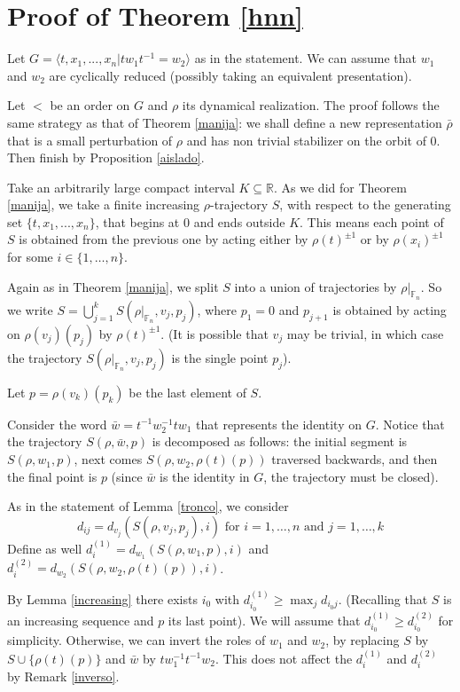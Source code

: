 \documentclass[12pt]{article}
\newcommand{\F}{\mathbb{F}}
\newcommand{\R}{\mathbb{R}}
\theoremstyle{definition}
\begin{document}
\section{Proof of Theorem \ref{hnn}} 

Let $G=\langle t,x_1,...,x_n|tw_1t^{-1}=w_2\rangle$ as in the statement. We can assume that $w_1$ and $w_2$ are cyclically reduced (possibly taking an equivalent presentation). 

Let $<$ be an order on $G$ and $\rho$ its dynamical realization. The proof follows the same strategy as that of Theorem \ref{manija}: we shall define a new representation $\bar\rho$ that is a small perturbation of $\rho$ and has non trivial stabilizer on the orbit of 0. Then finish by Proposition \ref{aislado}.

Take an arbitrarily large compact interval $K\subseteq \R$. As we did for Theorem \ref{manija}, we take a finite increasing $\rho$-trajectory $S$, with respect to the generating set $\{t,x_1,...,x_n\}$, that begins at $0$ and ends outside $K$. This means each point of $S$ is obtained from the previous one by acting either by $\rho(t)^{\pm 1}$ or by $\rho(x_i)^{\pm 1}$ for some $i\in\{1,\ldots,n\}$. 

Again as in Theorem \ref{manija}, we split $S$ into a union of trajectories by $\rho|_{\F_n}$. So we write $S=\bigcup_{j=1}^k S(\rho|_{\F_n},v_j,p_j)$, where $p_1=0$ and $p_{j+1}$ is obtained by acting on $\rho(v_j)(p_j)$ by $\rho(t)^{\pm 1}$. (It is possible that $v_j$ may be trivial, in which case the trajectory $S(\rho|_{\F_n},v_j,p_j)$ is the single point $p_j$). 

Let $p=\rho(v_k)(p_k)$ be the last element of $S$.

Consider the word $\bar w=t^{-1}w_2^{-1}tw_1$ that represents the identity on $G$. Notice that the trajectory $S(\rho,\bar w,p)$ is decomposed as follows: the initial segment is $S(\rho,w_1,p)$, next comes $S(\rho,w_2,\rho(t)(p))$ traversed backwards, and then the final point is $p$ (since $\bar w$ is the identity in $G$, the trajectory must be closed).  

As in the statement of Lemma \ref{tronco}, we consider $$d_{ij} = d_{v_j}(S(\rho,v_j,p_j),i) \text{ for } i=1,\ldots,n \text{ and } j=1,\ldots,k$$
Define as well $d_i^{(1)} = d_{w_1}(S(\rho,w_1,p),i)$ and $d_i^{(2)}=d_{w_2}(S(\rho,w_2,\rho(t)(p)),i)$.   

By Lemma \ref{increasing} there exists $i_0$ with $d_{i_0}^{(1)}\geq\max_j d_{i_0j}$. (Recalling that $S$ is an increasing sequence and $p$ its last point). We will assume that $d_{i_0}^{(1)}\geq d_{i_0}^{(2)}$ for simplicity. Otherwise, we can invert the roles of $w_1$ and $w_2$, by replacing $S$ by $S\cup\{\rho(t)(p)\}$ and $\bar w$ by $tw_1^{-1}t^{-1}w_2$. This does not affect the $d_{i}^{(1)}$ and $d_{i}^{(2)}$ by Remark \ref{inverso}.
\end{document}
